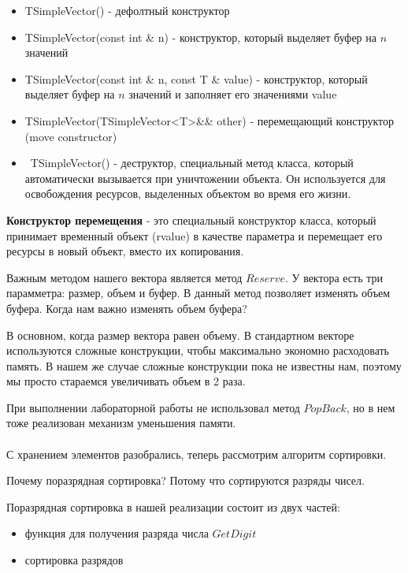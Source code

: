 \begin{itemize}
	\item TSimpleVector() - дефолтный конструктор
	\item TSimpleVector(const int \& n) - конструктор, который выделяет буфер на $n$ значений
	\item TSimpleVector(const int \& n, const T \& value) - конструктор, который выделяет буфер на $n$ значений и заполняет его значениями value
	\item TSimpleVector(TSimpleVector<T>\&\& other) - перемещающий конструктор (move constructor)
	\item ~TSimpleVector() - деструктор, специальный метод класса, который автоматически вызывается при уничтожении объекта. Он используется для освобождения ресурсов, выделенных объектом во время его жизни.
\end{itemize}


\textbf{Конструктор перемещения} - это специальный конструктор класса, который принимает временный объект (rvalue) 
в качестве параметра и перемещает его ресурсы в новый объект, вместо их копирования.

Важным методом нашего вектора является метод $Reserve$. У вектора есть три парамметра: размер, объем и буфер. 
В данный метод позволяет изменять объем буфера. Когда нам важно изменять объем буфера?

В основном, когда размер вектора равен объему. В стандартном векторе используются сложные конструкции, чтобы максимально экономно расходовать память.
В нашем же случае сложные конструкции пока не известны нам, поэтому мы просто стараемся увеличивать объем в 2 раза.

При выполнении лабораторной работы не использовал метод $PopBack$, но в нем тоже реализован механизм уменьшения памяти.\\\\

С хранением элементов разобрались, теперь рассмотрим алгоритм сортировки.

Почему поразрядная сортировка? Потому что сортируются разряды чисел.

Поразрядная сортировка в нашей реализации состоит из двух частей: \\

\begin{itemize}
	\item функция для получения разряда числа $GetDigit$
	\item сортировка разрядов
\end{itemize}

